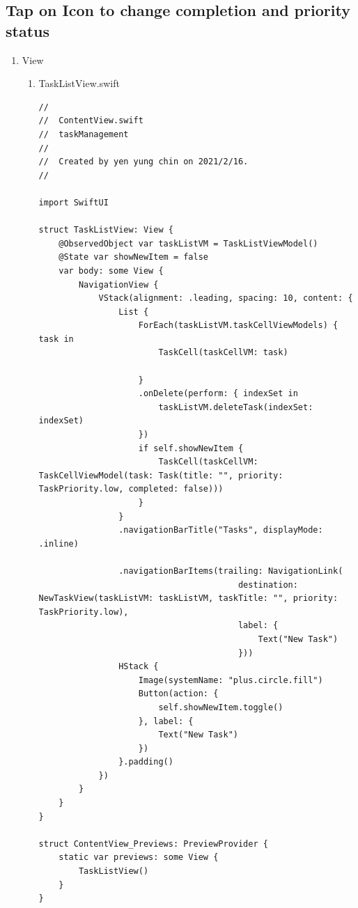 \documentclass[a4paper,12pt]{article}
\begin{document}
\subsection{Tap on Icon to change completion and priority status}
\label{SW-onTapGesture}
\begin{enumerate}
\item View
\label{sec:org9914c9c}
\begin{enumerate}
\item TaskListView.swift
\label{sec:orgd11bdc3}
\lstset{breaklines=true,language=swift,label= ,caption= ,captionpos=b,firstnumber=1,numbers=left}
\begin{lstlisting}
//
//  ContentView.swift
//  taskManagement
//
//  Created by yen yung chin on 2021/2/16.
//

import SwiftUI

struct TaskListView: View {
    @ObservedObject var taskListVM = TaskListViewModel()
    @State var showNewItem = false
    var body: some View {
        NavigationView {
            VStack(alignment: .leading, spacing: 10, content: {
                List {
                    ForEach(taskListVM.taskCellViewModels) { task in
                        TaskCell(taskCellVM: task)

                    }
                    .onDelete(perform: { indexSet in
                        taskListVM.deleteTask(indexSet: indexSet)
                    })
                    if self.showNewItem {
                        TaskCell(taskCellVM: TaskCellViewModel(task: Task(title: "", priority: TaskPriority.low, completed: false)))
                    }
                }
                .navigationBarTitle("Tasks", displayMode: .inline)

                .navigationBarItems(trailing: NavigationLink(
                                        destination: NewTaskView(taskListVM: taskListVM, taskTitle: "", priority: TaskPriority.low),
                                        label: {
                                            Text("New Task")
                                        }))
                HStack {
                    Image(systemName: "plus.circle.fill")
                    Button(action: {
                        self.showNewItem.toggle()
                    }, label: {
                        Text("New Task")
                    })
                }.padding()
            })
        }
    }
}

struct ContentView_Previews: PreviewProvider {
    static var previews: some View {
        TaskListView()
    }
}


\end{lstlisting}
\end{enumerate}
\end{enumerate}
\end{document}
